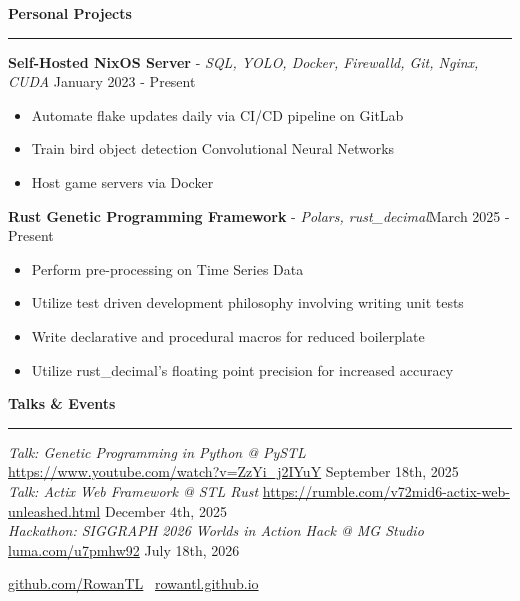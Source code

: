 \documentclass[11pt]{article}
\begin{document}
\vspace{1pt}  %
\textbf{Personal Projects}\par
\vspace{-12pt}
\noindent\rule{\textwidth}{0.4pt}

\textbf{Self-Hosted NixOS Server} - \textsl{SQL, YOLO, Docker, Firewalld, Git, Nginx, CUDA} \hfill January 2023 - Present
\begin{itemize}[noitemsep, topsep=0pt, partopsep=0pt, parsep=0pt, itemsep=0pt]
    \small
    \item Automate flake updates daily via CI/CD pipeline on GitLab
    \item Train bird object detection Convolutional Neural Networks
    \item Host game servers via Docker
\end{itemize}

\textbf{Rust Genetic Programming Framework} - \textsl{Polars, rust\_decimal}\hfill March 2025 - Present
\begin{itemize}[noitemsep, topsep=0pt, partopsep=0pt, parsep=0pt, itemsep=0pt]
    \small
    \item Perform pre-processing on Time Series Data
    \item Utilize test driven development philosophy involving writing unit tests
    \item Write declarative and procedural macros for reduced boilerplate
    \item Utilize rust\_decimal's floating point precision for increased accuracy
\end{itemize}

\textbf{Talks \& Events}\par
\vspace{-12pt}
\noindent\rule{\textwidth}{0.4pt}

\textsl{Talk: Genetic Programming in Python @ PySTL} \tiny{\href{https://www.youtube.com/watch?v=ZzYi\_j2IYuY}{https://www.youtube.com/watch?v=ZzYi\_j2IYuY}} \hfill \normalsize{September 18th, 2025}\\
\textsl{Talk: Actix Web Framework @ STL Rust} \tiny{\href{https://rumble.com/v72mid6-actix-web-unleashed.html}{https://rumble.com/v72mid6-actix-web-unleashed.html}} \hfill \normalsize{December 4th, 2025} \\
\textsl{Hackathon: SIGGRAPH 2026 Worlds in Action Hack @ MG Studio} \tiny{\href{luma.com/u7pmhw92}{luma.com/u7pmhw92}} \hfill \normalsize{July 18th, 2026}


\begin{center}
    \tiny{\href{https://github.com/RowanTL}{github.com/RowanTL} \textbullet \ \href{https://rowantl.github.io/}{rowantl.github.io}}
\end{center}
\end{document}
